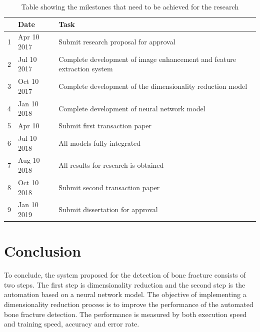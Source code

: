 \documentclass[11pt,twocolumn]{witseiepaper}
\begin{document}
	\begin{table}[!h]
		\centering
		\caption{Table showing the milestones that need to be achieved for the research}
		\label{tb: milestones}
		\begin{tabular}{| c | l | p{5cm} |}
			\hline 
			& Date & Task \\
			\hline \hline
			1 & Apr 10 2017 & Submit research proposal for approval\\
			\hline
			2 & Jul 10 2017 & Complete development of image enhancement and feature extraction system \\
			\hline
			3 & Oct 10 2017 & Complete development of the dimensionality reduction model \\
			\hline
			4 & Jan 10 2018 & Complete development of neural network model \\
			\hline
			5 & Apr 10 & Submit first transaction paper \\
			\hline
			6 & Jul 10 2018 & All models fully integrated \\
			\hline
			7 & Aug 10 2018 & All results for research is obtained \\
			\hline
			8 & Oct 10 2018 & Submit second transaction paper \\
			\hline
			9 & Jan 10 2019 & Submit dissertation for approval \\
			\hline
		\end{tabular}
	\end{table}
	
	\section{Conclusion}
	\label{sc: Conclusion}
	To conclude, the system proposed for the detection of bone fracture consists of two steps. The first step is dimensionality reduction and the second step is the automation based on a neural network model. The objective of implementing a dimensionality reduction process is to improve the performance of the automated bone fracture detection. The performance is measured by both execution speed and training speed, accuracy and error rate. 
	
	
	
	
\end{document}

